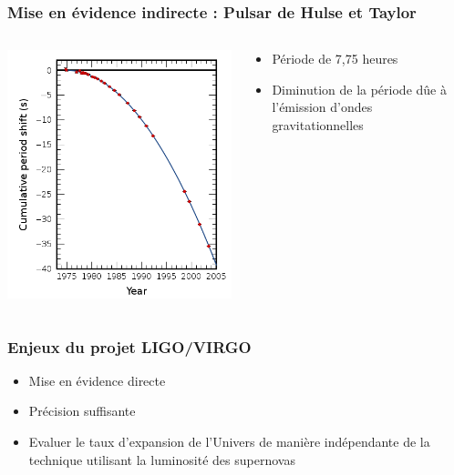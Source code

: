 \documentclass{beamer}
\begin{document}
\begin{frame}
	\frametitle{Mise en évidence indirecte : Pulsar de Hulse et Taylor}
	\begin{columns}
	\begin{column}{0.5\textwidth}
		\includegraphics[scale=0.3]{Docs/period_shift_pulsar.png}
	\end{column}
	\begin{column}{0.5\textwidth}
		\begin{itemize}
			\item Période de 7,75 heures
			\item Diminution de la période dûe à l'émission d'ondes gravitationnelles
		\end{itemize}

	\end{column}
	\end{columns}
\end{frame}

\begin{frame}
	\frametitle{Enjeux du projet LIGO/VIRGO}
	\begin{itemize}
		\item Mise en évidence directe
		\item Précision suffisante
		\item Evaluer le taux d'expansion de l'Univers de manière indépendante de la technique utilisant la luminosité des supernovas
	\end{itemize}

\end{frame}
\end{document}
